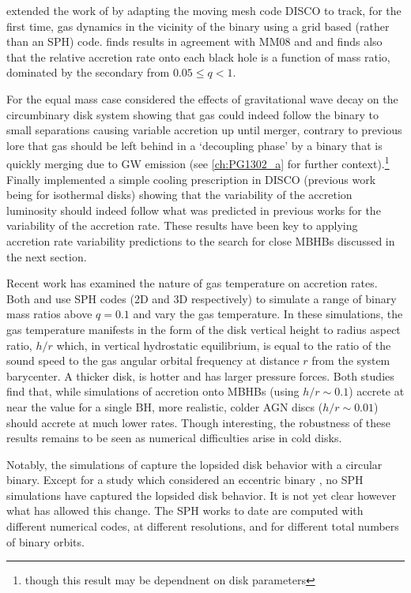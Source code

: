 \cite{Farris:2014} extended the work of \cite{DHM:2013:MNRAS} by adapting the
moving mesh code DISCO \citep{Duffell:2011:TESS,
DuffellMHDDISCO:2016} to track, for the first time, gas dynamics in the
vicinity of the binary using a grid based (rather than an SPH)
code. \cite{Farris:2014} finds results in agreement with MM08 and
\cite{DHM:2013:MNRAS} and finds also that the relative accretion rate onto
each black hole is a function of mass ratio, dominated by the secondary from
$0.05 \leq q < 1$. 


For the equal mass case \cite{Farris:2015:GW} considered the effects of
gravitational wave decay on the circumbinary disk system showing that gas
could indeed follow the binary to small separations causing variable accretion
up until merger, contrary to previous lore that gas should be left behind in a
`decoupling phase' by a binary that is quickly merging due to GW emission (see
\ref{ch:PG1302_a} for further context).\footnote{though this result may be
dependnent on disk parameters} Finally \cite{Farris:2015:Cool} implemented a
simple cooling prescription in DISCO (previous work being for isothermal
disks) showing that the variability of the accretion luminosity should indeed
follow what was predicted in previous works for the variability of the
accretion rate. These results have been key to applying accretion rate
variability predictions to the search for close MBHBs discussed in the next
section.



Recent work has examined the nature of gas temperature on accretion rates.
Both \cite{YoungClarke:2015} and \cite{RagusaLodato:2016} use SPH codes (2D
and 3D respectively) to simulate a range of binary mass ratios above $q=0.1$
and vary the gas temperature. In these simulations, the gas temperature
manifests in the form of the disk vertical height to radius aspect ratio,
$h/r$ which, in vertical hydrostatic equilibrium, is equal to the ratio of the
sound speed to the gas angular orbital frequency at distance $r$ from the
system barycenter. A thicker disk, is hotter and has larger pressure forces.
Both studies find that, while simulations of accretion onto MBHBs (using $h/r \sim
0.1$) accrete at near the value for a single BH, more realistic, colder AGN
discs ($h/r \sim 0.01$) should accrete at much lower rates. Though
interesting, the robustness of these results remains to be seen as numerical
difficulties arise in cold disks.%


Notably, the simulations of \cite{RagusaLodato:2016} capture the lopsided disk
behavior with a circular binary. Except for a study which considered an
eccentric binary \citep{Dunhill+2015}, no SPH simulations have captured the
lopsided disk behavior. It is not yet clear however what has allowed this
change. The SPH works to date are computed with different numerical codes, at
different resolutions, and for different total numbers of binary orbits.

